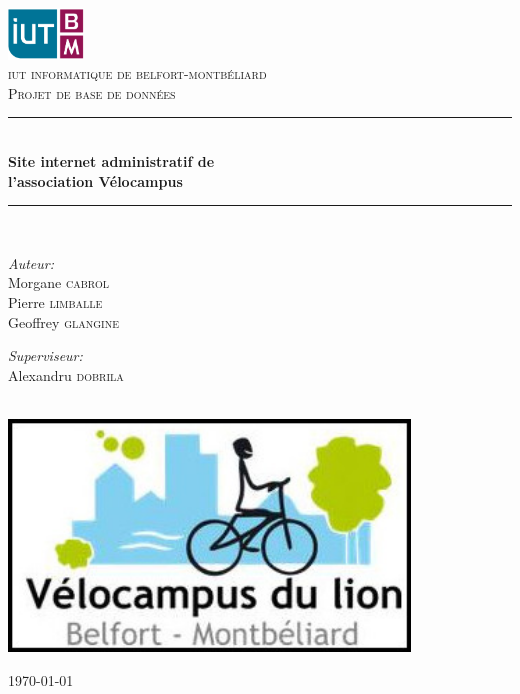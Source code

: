 \documentclass[11pt,a4paper,titlepage]{report}
\newcommand{\HRule}{\rule{\linewidth}{0.5mm}}
\begin{document}
\renewcommand{\thefootnote}{\fnsymbol{footnote}}
\begin{titlepage}
\begin{center}

\includegraphics[width=0.15\textwidth]{logo.png}~
\\[1cm]
\textsc{\LARGE iut informatique de belfort-montbéliard}\\[1cm]

\textsc{\Large Projet de base de données}\\[0.5cm]

\HRule \\[0.4cm]
{ \huge \bfseries Site internet administratif de\\
l'association Vélocampus \\[0.4cm] }

\HRule \\[1.5cm]

\begin{minipage}{0.4\textwidth}
\begin{flushleft} \large
\emph{Auteur:}\\
Morgane \textsc{cabrol}\\
Pierre \textsc{limballe}\\
Geoffrey \textsc{glangine}
\end{flushleft}
\end{minipage}
\begin{minipage}{0.4\textwidth}
\begin{flushright} \large
\emph{Superviseur:} \\
Alexandru  \textsc{dobrila}
\end{flushright}
\end{minipage}
\\[1cm]
\includegraphics[width=0.8\textwidth]{site.jpg}~
\\[1cm]
\vfill

{\large \today}

\end{center}
\end{titlepage}
\end{document}
